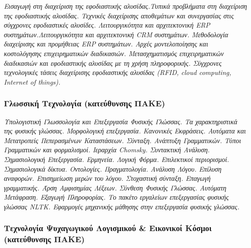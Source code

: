 \emph{Εισαγωγή στη διαχείριση της εφοδιαστικής αλυσίδας.Τυπικά
προβλήματα στη διαχείριση της εφοδιαστικής αλυσίδας. Τεχνικές
διαχείρισης αποθεμάτων και συνεργασίας στις σύγχρονες εφοδιαστικές
αλυσίδες. Λειτουργικότητα και αρχιτεκτονική ERP
συστημάτων.Λειτουργικότητα και αρχιτεκτονική CRM συστημάτων. Μεθοδολογία
διαχείρισης και προμήθειας ERP συστημάτων. Αρχές μοντελοποίησης και
κοστολόγησης επιχειρηματικών διαδικασιών. Μετασχηματισμός
επιχειρηματικών διαδικασιών και εφοδιαστικής αλυσίδας με τη χρήση
πληροφορικής. Σύγχρονες τεχνολογικές τάσεις διαχείρισης εφοδιαστικής
αλυσίδας (RFID, cloud computing, Internet of things).}

\hypertarget{ux3b3ux3bbux3c9ux3c3ux3c3ux3b9ux3baux3ae-ux3c4ux3b5ux3c7ux3bdux3bfux3bbux3bfux3b3ux3afux3b1-ux3baux3b1ux3c4ux3b5ux3cdux3b8ux3c5ux3bdux3c3ux3b7ux3c2-ux3c0ux3b1ux3baux3b5}{%
\subsubsection{Γλωσσική Τεχνολογία (κατεύθυνσης
ΠΑΚΕ)}\label{ux3b3ux3bbux3c9ux3c3ux3c3ux3b9ux3baux3ae-ux3c4ux3b5ux3c7ux3bdux3bfux3bbux3bfux3b3ux3afux3b1-ux3baux3b1ux3c4ux3b5ux3cdux3b8ux3c5ux3bdux3c3ux3b7ux3c2-ux3c0ux3b1ux3baux3b5}}

\emph{Υπολογιστική Γλωσσολογία και Επεξεργασία Φυσικής Γλώσσας. Τα
χαρακτηριστικά της φυσικής γλώσσας. Μορφολογική επεξεργασία. Κανονικές
Εκφράσεις. Αυτόματα και Μετατροπείς Πεπερασμένων Καταστάσεων. Σύνταξη.
Ανάπτυξη Γραμματικών. Τύποι Γραμματικών και φορμαλισμοί. Iεραρχία
Chomsky. Συντακτική Ανάλυση. Σημασιολογική Επεξεργασία. Ερμηνεία. Λογική
Φόρμα. Επιλεκτικοί περιορισμοί. Σημασιολογικά δίκτυα. Οντολογίες.
Πραγματολογία. Ανάλυση Λόγου. Επίλυση αναφορών. Επισημείωση μερών του
λόγου. Στοχαστική σύνταξη. Επαγωγή γραμματικής. Άρση Αμφισημίας Λέξεων.
Σύνθεση Φυσικής Γλώσσας. Αυτόματη Μετάφραση. Εξαγωγή Πληροφορίας. Το
πακέτο εργαλείων επεξεργασίας φυσικής γλώσσας NLTK. Εφαρμογές μηχανικής
μάθησης στην επεξεργασία φυσικής γλώσσας.}

\hypertarget{ux3c4ux3b5ux3c7ux3bdux3bfux3bbux3bfux3b3ux3afux3b1-ux3c8ux3c5ux3c7ux3b1ux3b3ux3c9ux3b3ux3b9ux3baux3bfux3cd-ux3bbux3bfux3b3ux3b9ux3c3ux3bcux3b9ux3baux3bfux3cd-ux3b5ux3b9ux3baux3bfux3bdux3b9ux3baux3bfux3af-ux3baux3ccux3c3ux3bcux3bfux3b9-ux3baux3b1ux3c4ux3b5ux3cdux3b8ux3c5ux3bdux3c3ux3b7ux3c2-ux3c0ux3b1ux3baux3b5}{%
\subsubsection{Τεχνολογία Ψυχαγωγικού Λογισμικού \& Εικονικοί Κόσμοι
(κατεύθυνσης
ΠΑΚΕ)}\label{ux3c4ux3b5ux3c7ux3bdux3bfux3bbux3bfux3b3ux3afux3b1-ux3c8ux3c5ux3c7ux3b1ux3b3ux3c9ux3b3ux3b9ux3baux3bfux3cd-ux3bbux3bfux3b3ux3b9ux3c3ux3bcux3b9ux3baux3bfux3cd-ux3b5ux3b9ux3baux3bfux3bdux3b9ux3baux3bfux3af-ux3baux3ccux3c3ux3bcux3bfux3b9-ux3baux3b1ux3c4ux3b5ux3cdux3b8ux3c5ux3bdux3c3ux3b7ux3c2-ux3c0ux3b1ux3baux3b5}}

